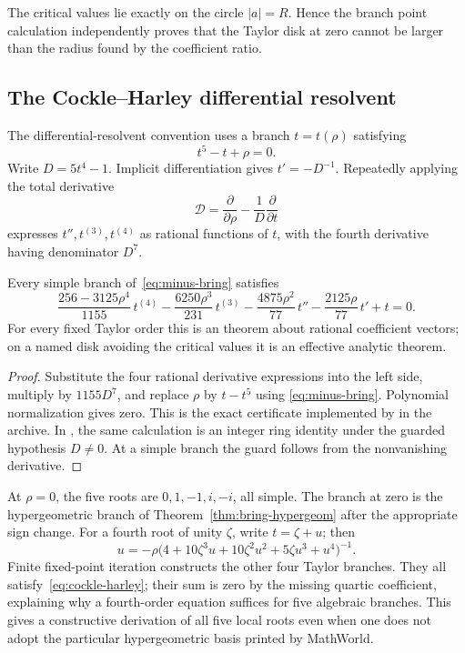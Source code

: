 The critical values lie exactly on the circle \(|a|=R\).  Hence the branch
point calculation independently proves that the Taylor disk at zero cannot be
larger than the radius found by the coefficient ratio.

\subsection{The Cockle--Harley differential resolvent}

The differential-resolvent convention uses a branch \(t=t(\rho)\) satisfying
\begin{equation}\label{eq:minus-bring}
 t^5-t+\rho=0.
\end{equation}
Write \(D=5t^4-1\).  Implicit differentiation gives
\(t'=-D^{-1}\).  Repeatedly applying the total derivative
\[
 \mathcal D=\frac{\partial}{\partial\rho}
            -\frac1D\frac{\partial}{\partial t}
\]
expresses \(t'',t^{(3)},t^{(4)}\) as rational functions of \(t\), with the
fourth derivative having denominator \(D^7\).

\begin{theorem}\label{thm:differential-resolvent}
Every simple branch of~\eqref{eq:minus-bring} satisfies
\begin{equation}\label{eq:cockle-harley}
 \frac{256-3125\rho^4}{1155}\,t^{(4)}
 -\frac{6250\rho^3}{231}\,t^{(3)}
 -\frac{4875\rho^2}{77}\,t''
 -\frac{2125\rho}{77}\,t'
 +t=0.
\end{equation}
For every fixed Taylor order this is an \ipra{} theorem about rational
coefficient vectors; on a named disk avoiding the critical values it is an
effective analytic theorem.
\end{theorem}

\begin{proof}
Substitute the four rational derivative expressions into the left side,
multiply by \(1155D^7\), and replace \(\rho\) by \(t-t^5\) using
\eqref{eq:minus-bring}.  Polynomial normalization gives zero.  This is the
exact certificate implemented by  in the
archive.  In \ipra{}, the same calculation is an integer ring identity under
the guarded hypothesis \(D\ne0\).  At a simple branch the guard follows from
the nonvanishing derivative.
\end{proof}

At \(\rho=0\), the five roots are \(0,1,-1,i,-i\), all simple.  The branch at
zero is the hypergeometric branch of Theorem~\ref{thm:bring-hypergeom} after the
appropriate sign change.  For a fourth root of unity \(\zeta\), write
\(t=\zeta+u\); then
\[
 u=-\rho\bigl(4+10\zeta^3u+10\zeta^2u^2+5\zeta u^3+u^4\bigr)^{-1}.
\]
Finite fixed-point iteration constructs the other four Taylor branches.  They
all satisfy~\eqref{eq:cockle-harley}; their sum is zero by the missing quartic
coefficient, explaining why a fourth-order equation suffices for five
algebraic branches.  This gives a constructive derivation of all five local
roots even when one does not adopt the particular hypergeometric basis printed
by MathWorld.
